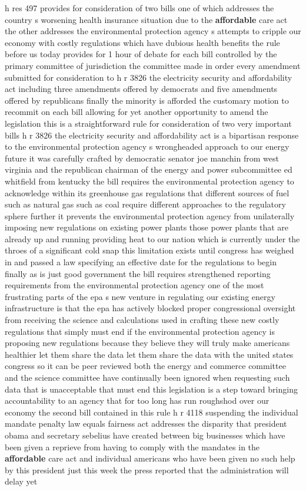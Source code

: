 \documentclass{article}
\begin{document}
\vspace{8mm}
h res 497 provides for consideration of two bills one of which addresses the country s worsening health insurance situation due to the {\bf \color{red} affordable} care act the other addresses the environmental protection agency s attempts to cripple our economy with costly regulations which have dubious health benefits the rule before us today provides for 1 hour of debate for each bill controlled by the primary committee of jurisdiction the committee made in order every amendment submitted for consideration to h r 3826 the electricity security and affordability act including three amendments offered by democrats and five amendments offered by republicans finally the minority is afforded the customary motion to recommit on each bill allowing for yet another opportunity to amend the legislation this is a straightforward rule for consideration of two very important bills h r 3826 the electricity security and affordability act is a bipartisan response to the environmental protection agency s wrongheaded approach to our energy future it was carefully crafted by democratic senator joe manchin from west virginia and the republican chairman of the energy and power subcommittee ed whitfield from kentucky the bill requires the environmental protection agency to acknowledge within its greenhouse gas regulations that different sources of fuel such as natural gas such as coal require different approaches to the regulatory sphere further it prevents the environmental protection agency from unilaterally imposing new regulations on existing power plants those power plants that are already up and running providing heat to our nation which is currently under the throes of a significant cold snap this limitation exists until congress has weighed in and passed a law specifying an effective date for the regulations to begin finally as is just good government the bill requires strengthened reporting requirements from the environmental protection agency one of the most frustrating parts of the epa s new venture in regulating our existing energy infrastructure is that the epa has actively blocked proper congressional oversight from receiving the science and calculations used in crafting these new costly regulations that simply must end if the environmental protection agency is proposing new regulations because they believe they will truly make americans healthier let them share the data let them share the data with the united states congress so it can be peer reviewed both the energy and commerce committee and the science committee have continually been ignored when requesting such data that is unacceptable that must end this legislation is a step toward bringing accountability to an agency that for too long has run roughshod over our economy the second bill contained in this rule h r 4118 suspending the individual mandate penalty law equals fairness act addresses the disparity that president obama and secretary sebelius have created between big businesses which have been given a reprieve from having to comply with the mandates in the {\bf \color{red} affordable} care act and individual americans who have been given no such help by this president just this week the press reported that the administration will delay yet 
\end{document}
